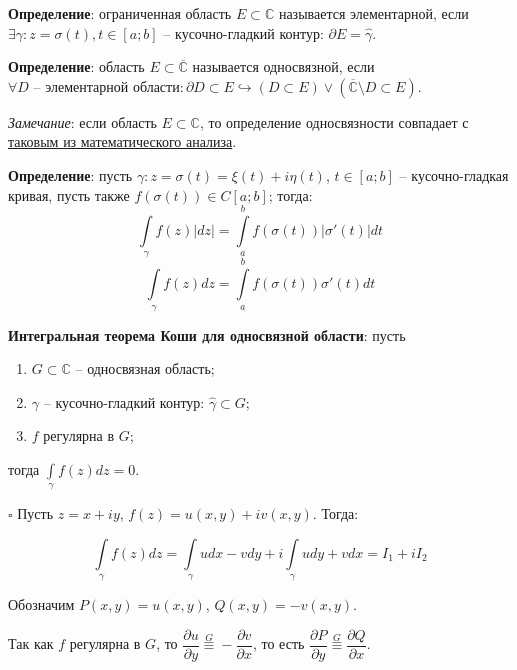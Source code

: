 \documentclass[12pt, a4paper, reqno]{article}
\begin{document}
    \textbf{Определение}: ограниченная область $E \subset \mathbb{C}$ называется элементарной, если
    $\exists \gamma: z = \sigma(t), t \in [a; b]$ -- кусочно-гладкий контур: $\partial E = \hat{\gamma}$.

    \textbf{Определение}: область $E \subset \overline{\mathbb{C}}$ называется односвязной, если
    $\forall D\text{ -- элементарной области}: \partial D \subset E \hookrightarrow (D \subset E)
    \vee (\overline{\mathbb{C}} \setminus D \subset E)$.

    \textit{Замечание}: если область $E \subset \mathbb{C}$, то определение односвязности совпадает
    с \hyperlink{simply-connected}{таковым из математического анализа}.

    \textbf{Определение}: пусть $\gamma: z = \sigma(t) = \xi(t) + i\eta(t)$, $t \in [a; b]$ --
    кусочно-гладкая кривая, пусть также $f(\sigma(t)) \in C[a; b]$; тогда:
    \begin{equation*}
        \int\limits_{\gamma} f(z)|dz| = \int\limits_{a}^{b} f(\sigma(t))|\sigma'(t)|dt
    \end{equation*}
    \begin{equation*}
        \int\limits_{\gamma} f(z)dz = \int\limits_{a}^{b} f(\sigma(t))\sigma'(t)dt
    \end{equation*}

    \textbf{Интегральная теорема Коши для односвязной области}: пусть
    \begin{enumerate}
        \item $G \subset \mathbb{C}$ -- односвязная область;
        \item $\gamma$ -- кусочно-гладкий контур: $\hat{\gamma} \subset G$;
        \item $f$ регулярна в $G$;
    \end{enumerate}
    тогда $\int\limits_{\gamma} f(z)dz = 0$.

    $\square$ Пусть $z = x + iy$, $f(z) = u(x, y) + iv(x, y)$. Тогда:

    \begin{equation*}
        \int\limits_{\gamma} f(z)dz = \int\limits_{\gamma} udx - vdy + i \int\limits_{\gamma} udy + vdx =
        I_1 + i I_2
    \end{equation*}

    Обозначим $P(x, y) = u(x, y)$, $Q(x, y) = -v(x, y)$.

    Так как $f$ регулярна в $G$, то
    $\dfrac{\partial u}{\partial y} \overset{G}{\equiv} -\dfrac{\partial v}{\partial x}$, то есть
    $\dfrac{\partial P}{\partial y} \overset{G}{\equiv} \dfrac{\partial Q}{\partial x}$.
\end{document}
